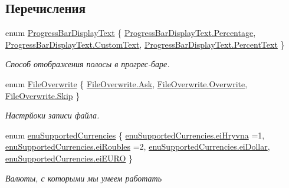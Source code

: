 \subsection*{Перечисления}
\begin{DoxyCompactItemize}
\item 
enum \mbox{\hyperlink{namespace_f_b_a_a3379f961332d4dfe27911508655249b2}{Progress\+Bar\+Display\+Text}} \{ \mbox{\hyperlink{namespace_f_b_a_a3379f961332d4dfe27911508655249b2a37be07209f53a5d636d5c904ca9ae64c}{Progress\+Bar\+Display\+Text.\+Percentage}}, 
\mbox{\hyperlink{namespace_f_b_a_a3379f961332d4dfe27911508655249b2a61534008683fdfaa116faa6097518761}{Progress\+Bar\+Display\+Text.\+Custom\+Text}}, 
\mbox{\hyperlink{namespace_f_b_a_a3379f961332d4dfe27911508655249b2ab852fb09ea14ce4eaa9e200340fb7d75}{Progress\+Bar\+Display\+Text.\+Percent\+Text}}
 \}
\begin{DoxyCompactList}\small\item\em Способ отображения полосы в прогрес-\/баре. \end{DoxyCompactList}\item 
enum \mbox{\hyperlink{namespace_f_b_a_a5997ae2d800272abf46b0da1e6f93c2c}{File\+Overwrite}} \{ \mbox{\hyperlink{namespace_f_b_a_a5997ae2d800272abf46b0da1e6f93c2caa0b271a9d8aa8e7473922164d6a1c03c}{File\+Overwrite.\+Ask}}, 
\mbox{\hyperlink{namespace_f_b_a_a5997ae2d800272abf46b0da1e6f93c2cada364eb37e143f6b2b5559aa03f5913a}{File\+Overwrite.\+Overwrite}}, 
\mbox{\hyperlink{namespace_f_b_a_a5997ae2d800272abf46b0da1e6f93c2ca72ef2b9b6965d078e3c7f95487a82d1c}{File\+Overwrite.\+Skip}}
 \}
\begin{DoxyCompactList}\small\item\em Настрйоки записи файла. \end{DoxyCompactList}\item 
enum \mbox{\hyperlink{namespace_f_b_a_ab66a78a6864c0acc8ce406f0a51fe693}{enu\+Supported\+Currencies}} \{ \mbox{\hyperlink{namespace_f_b_a_ab66a78a6864c0acc8ce406f0a51fe693a54f7fa44203d6f4e49e780ee78970c69}{enu\+Supported\+Currencies.\+ei\+Hryvna}} =1, 
\mbox{\hyperlink{namespace_f_b_a_ab66a78a6864c0acc8ce406f0a51fe693a96a608ddd50d1d000d44e4f0ec68f43f}{enu\+Supported\+Currencies.\+ei\+Roubles}} =2, 
\mbox{\hyperlink{namespace_f_b_a_ab66a78a6864c0acc8ce406f0a51fe693ae688fbf88d806d7516989ebde2b6c89c}{enu\+Supported\+Currencies.\+ei\+Dollar}}, 
\mbox{\hyperlink{namespace_f_b_a_ab66a78a6864c0acc8ce406f0a51fe693a78337d7a47ffed80ea39e6613caf02b5}{enu\+Supported\+Currencies.\+ei\+E\+U\+RO}}
 \}
\begin{DoxyCompactList}\small\item\em Валюты, с которыми мы умеем работать \end{DoxyCompactList}\item 

\end{DoxyCompactItemize}
